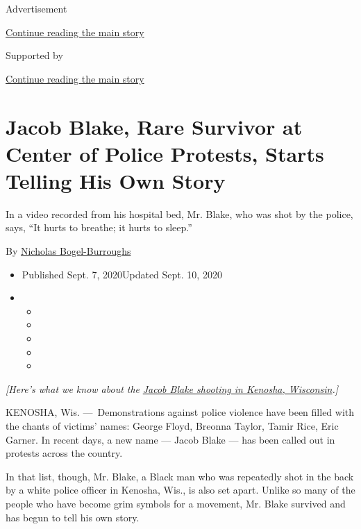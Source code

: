 Advertisement

\protect\hyperlink{after-top}{Continue reading the main story}

Supported by

\protect\hyperlink{after-sponsor}{Continue reading the main story}

\hypertarget{jacob-blake-rare-survivor-at-center-of-police-protests-starts-telling-his-own-story}{%
\section{Jacob Blake, Rare Survivor at Center of Police Protests, Starts
Telling His Own
Story}\label{jacob-blake-rare-survivor-at-center-of-police-protests-starts-telling-his-own-story}}

In a video recorded from his hospital bed, Mr. Blake, who was shot by
the police, says, ``It hurts to breathe; it hurts to sleep.''

By
\href{https://www.nytimes3xbfgragh.onion/by/nicholas-bogel-burroughs}{Nicholas
Bogel-Burroughs}

\begin{itemize}
\item
  Published Sept. 7, 2020Updated Sept. 10, 2020
\item
  \begin{itemize}
  \item
  \item
  \item
  \item
  \item
  \end{itemize}
\end{itemize}

\emph{{[}Here's what we know about the}
\href{https://www.nytimes3xbfgragh.onion/article/jacob-blake-shooting-kenosha.html}{\emph{Jacob
Blake shooting in Kenosha, Wisconsin}}\emph{.{]}}

KENOSHA, Wis. ---~Demonstrations against police violence have been
filled with the chants of victims' names: George Floyd, Breonna Taylor,
Tamir Rice, Eric Garner. In recent days, a new name --- Jacob Blake ---
has been called out in protests across the country.

In that list, though, Mr. Blake, a Black man who was repeatedly shot in
the back by a white police officer in Kenosha, Wis., is also set apart.
Unlike so many of the people who have become grim symbols for a
movement, Mr. Blake survived and has begun to tell his own story.

